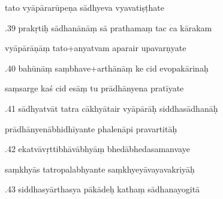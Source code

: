 \documentclass[article,12pt,a4paper]{memoir}%
\newcounter{parCount}
\begin{document}
	  
	  \pstart \leavevmode%
	tato vyāpārarūpeṇa sādhyeva vyavatiṣṭhate 
	{}
	\pend%
      

	  
	  \pstart {}.39 prakṛtiḥ sādhanānāṃ sā prathamaṃ tac ca kārakam 
	{}
	\pend%
      

	  
	  \pstart \leavevmode%
	vyāpārāṇāṃ tato+anyatvam aparair upavarṇyate 
	{}
	\pend%
      

	  
	  \pstart {}.40 bahūnāṃ saṃbhave+arthānāṃ ke cid evopakārinaḥ 
	{}
	\pend%
      

	  
	  \pstart \leavevmode%
	saṃsarge kaś cid esāṃ tu prādhānyena pratīyate 
	{}
	\pend%
      

	  
	  \pstart {}.41 sādhyatvāt tatra cākhyātair vyāpārāḥ siddhasādhanāḥ 
	{}
	\pend%
      

	  
	  \pstart \leavevmode%
	prādhānyenābhidhīyante phalenāpi pravartitāḥ 
	{}
	\pend%
      

	  
	  \pstart {}.42 ekatvāvṛttibhāvābhyāṃ bhedābhedasamanvaye 
	{}
	\pend%
      

	  
	  \pstart \leavevmode%
	saṃkhyās tatropalabhyante saṃkhyeyāvayavakriyāḥ 
	{}
	\pend%
      

	  
	  \pstart {}.43 siddhasyārthasya pākādeḥ kathaṃ sādhanayogitā 
	{}
	\pend%
      
\end{document}
